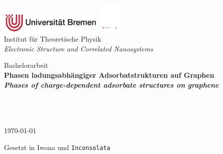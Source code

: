 \documentclass[a4paper, 10pt, twoside, openany]{book} %
\begin{document}
	\frontmatter
	
	
	\begin{titlepage}
		\centering
		
		\normalsize
		\includegraphics[width=5cm]{Abbildungen/Uni.pdf} \hfill \includegraphics[height=1.5cm]{Abbildungen/ITP.pdf} \\
		\hfill Institut für Theoretische Physik \\
		\hfill \emph{Electronic Structure and Correlated Nanosystems}
		
		\vfill
		
		\Large
		Bachelorarbeit \\[3pc]
		
		\bf \Huge
		Phasen ladungsabhängiger Adsorbatstrukturen auf Graphen \\[3pc]
		
		\it \normalsize
		Phases of charge-dependent adsorbate structures on graphene
		
		\vfill
		
		\normalfont \large
		\hspace{0cm}\hspace{1pc} \\[1pc]
		\hspace{0cm}\hspace{1pc} \\
		\hspace{0cm}\hspace{1pc} \\[2pc]
		
		\today
		
		\vfill
	\end{titlepage}
	
	
	\tableofcontents
	
	\vfill
	
	\begin{flushright}
		\footnotesize
		Gesetzt in Iwona und \texttt{Inconsolata}
	\end{flushright}
	
\end{document}

